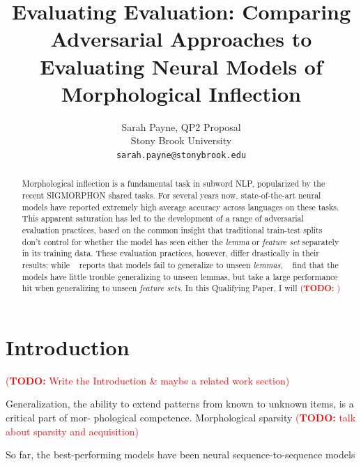 \documentclass[11pt]{article}
\title{Evaluating Evaluation: Comparing Adversarial Approaches to Evaluating Neural Models of Morphological Inflection}
\author{Sarah Payne, QP2 Proposal\\
  Stony Brook University \\
  \texttt{sarah.payne@stonybrook.edu} }
\newcommand{\todo}[1]{\textcolor{red}{(\textbf{TODO:} #1)}}
\newcommand{\goldmant}{\citet{goldman-etal-2022-un}}
\newcommand{\kodnert}{\citet{kodner-etal-2022-sigmorphon}}
\begin{document}
\maketitle
\begin{abstract}
Morphological inflection is a fundamental task in subword NLP, popularized by the recent SIGMORPHON shared tasks. 
For several years now, state-of-the-art neural models have reported extremely high average accuracy across languages on these tasks. 
This apparent saturation has led to the development of a range of adversarial evaluation practices, based on the common insight that traditional train-test splits don't control for whether the model has seen either the \textit{lemma} or \textit{feature set} separately in its training data. 
These evaluation practices, however, differ drastically in their results: while \goldmant~ reports that models fail to generalize to unseen \textit{lemmas}, \kodnert~ find that the models have little trouble generalizing to unseen lemmas, but take a large performance hit when generalizing to unseen \textit{feature sets}. 
In this Qualifying Paper, I will \todo{}



\end{abstract}

\section{Introduction}

\todo{Write the Introduction \& maybe a related work section}

Generalization, the ability to extend patterns from known to unknown items, is a critical part of mor- phological competence. 
Morphological sparsity \todo{talk about sparsity and acquisition}

So far, the best-performing models have been neural sequence-to-sequence models \citep{kann-schutze-2016-med, canby-etal-2020-university}
\end{document}
